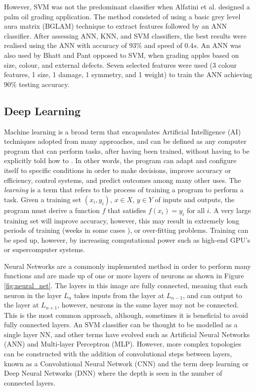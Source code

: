 \documentclass[fleqn,twoside,12pt]{report}
\begin{document}
However, SVM was not the predominant classifier when Alfatini et al.\cite{alfatni} designed a palm oil grading application. The method consisted of using a basic grey level aura matrix (BGLAM) technique to extract features followed by an ANN classifier. After assessing ANN, KNN, and SVM classifiers, the best results were realised using the ANN with accuracy of $93\%$ and speed of $0.4s$. An ANN was also used by Bhatt and Pant \cite{bhatt} opposed to SVM, when grading apples based on size, colour, and external defects. Seven selected features were used (3 colour features, 1 size, 1 damage, 1 symmetry, and 1 weight) to train the ANN achieving $90\%$ testing accuracy. 



\subsection{Deep Learning}

Machine learning is a broad term that encapsulates Artificial Intelligence (AI) techniques adopted from many approaches, and can be defined as any  computer program that can perform tasks, after having been trained,  without having to be explicitly told how to \cite{langley,shavlik,mohri}. In other words, the program can adapt and configure itself to specific conditions in order to make decisions, improve accuracy or efficiency, control systems, and predict outcomes among many other uses. The \textit{learning} is a term that refers to the process of training a program to perform a task. Given a training set $(x_i, y_i)$, $x\in X$, $y\in Y$ of inputs and outputs, the program must derive a function $f$ that satisfies $f(x_i) = y_i$ for all $i$. A very large training set will improve accuracy, however, this may result in extremely long periods of training (weeks in some cases \cite{bottou}), or over-fitting problems. Training can be sped up, however, by increasing computational power such as high-end GPU's or supercomputer systems.

Neural Networks are a commonly implemented method in order to perform many functions and are made up of one or more layers of neurons as shown in Figure \ref{fig:neural_net}. The layers in this image are fully connected, meaning that each neuron in the layer $L_n$ takes inputs from the layer at $L_{n-1}$, and can output to the layer at $L_{n+1}$, however, neurons in the same layer may not be connected. This is the most common approach, although, sometimes it is beneficial to avoid fully connected layers. An SVM classifier can be thought to be modelled as a single layer NN, and other terms have evolved such as Artificial Neural Networks (ANN) and Multi-layer Perceptron (MLP). However, more complex topologies can be constructed with the addition of convolutional steps between layers, known as a Convolutional Neural Network (CNN) and the term deep learning or Deep Neural Networks (DNN) where the depth is seen in the number of connected layers.  
\end{document}
